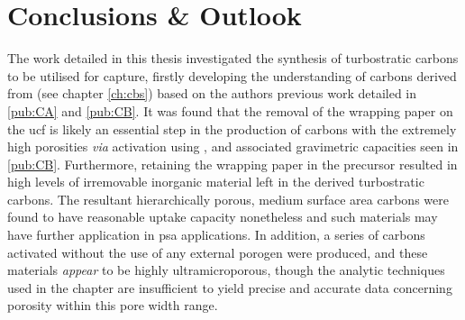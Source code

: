 \chapter{Conclusions \& Outlook}
\label{ch:conclusion}
The work detailed in this thesis investigated the synthesis of \glspl{turbostratic carbon} to be utilised for  capture, firstly developing the understanding of carbons derived from  (see chapter \ref{ch:cbs}) based on the authors previous work detailed in \ref{pub:CA} and \ref{pub:CB}. It was found that the removal of the wrapping paper on the \acrfull{ucf} is likely an essential step in the production of carbons with the extremely high porosities \textit{via} activation using , and associated gravimetric  capacities seen in \ref{pub:CB}. Furthermore, retaining the wrapping paper in the precursor resulted in high levels of irremovable inorganic material left in the derived \glspl{turbostratic carbon}. The resultant hierarchically porous, medium surface area carbons were found to have reasonable  uptake capacity nonetheless and such materials may have further application in \acrfull{psa} applications. In addition, a series of carbons activated without the use of any external \gls{porogen} were produced, and these materials \textit{appear} to be highly ultramicroporous, though the analytic techniques used in the chapter are insufficient to yield precise and accurate data concerning porosity within this pore width range. 

